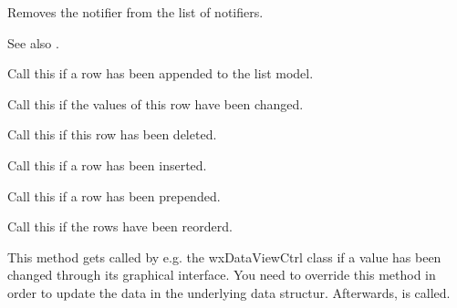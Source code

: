 
Removes the notifier from the list of notifiers.

See also .

\label{wxdataviewlistmodelrowappended}


Call this if a row has been appended to the list model.

\label{wxdataviewlistmodelrowchanged}


Call this if the values of this row have been changed.

\label{wxdataviewlistmodelrowdeleted}


Call this if this row has been deleted.

\label{wxdataviewlistmodelrowinserted}


Call this if a row has been inserted.

\label{wxdataviewlistmodelrowprepended}


Call this if a row has been prepended.

\label{wxdataviewlistmodelrowsreordered}


Call this if the rows have been reorderd.

\label{wxdataviewlistmodelsetvalue}


This method gets called by e.g. the wxDataViewCtrl class if a 
value has been changed through its graphical interface. You
need to override this method in order to update the data in
the underlying data structur. Afterwards, 
 is called.


